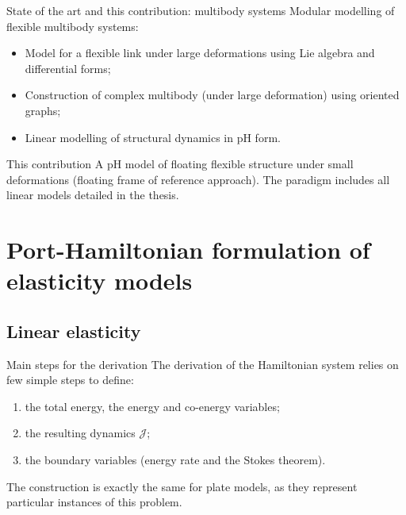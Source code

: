 \documentclass[aspectratio=169]{ISAE-Beamer}
\begin{document}
\begin{frame}{State of the art and this contribution: multibody systems}
Modular modelling of flexible multibody systems:
\begin{itemize}
\item Model for a flexible link under large deformations using Lie algebra and differential forms;
\item Construction of complex multibody (under large deformation) using oriented graphs;
\item Linear modelling of structural dynamics in pH form.
\end{itemize}

\begin{exampleblock}{This contribution}
A pH model of floating flexible structure under small deformations (floating frame of reference approach). The paradigm includes all linear models detailed in the thesis.
\end{exampleblock}

\end{frame}


\section{Port-Hamiltonian formulation of elasticity models}

\subsection{Linear elasticity}

\begin{frame}{Main steps for the derivation}
The derivation of the Hamiltonian system relies on few simple steps to define:
\begin{enumerate}
	\item the total energy, the energy and co-energy variables;
	\item the resulting dynamics  $\mathcal{J}$;
	\item the boundary variables (energy rate and the Stokes theorem).
\end{enumerate}
\vspace{10pt}
The construction is exactly the same for plate models, as they represent particular instances of this problem.
\end{frame}
\end{document}
